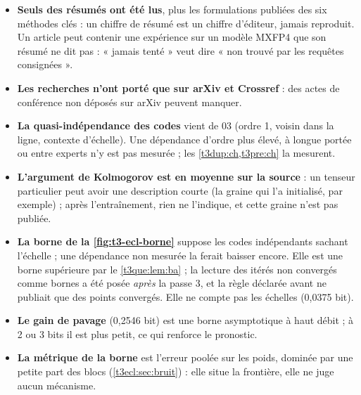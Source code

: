 \begin{faux}
\begin{itemize}
\item \textbf{Seuls des résumés ont été lus}, plus les formulations publiées des six méthodes clés : un chiffre de résumé est un chiffre d'éditeur, jamais reproduit. Un article peut contenir une expérience sur un modèle MXFP4 que son résumé ne dit pas : « jamais tenté » veut dire « non trouvé par les requêtes consignées ».
\item \textbf{Les recherches n'ont porté que sur arXiv et Crossref} : des actes de conférence non déposés sur arXiv peuvent manquer.
\item \textbf{La quasi-indépendance des codes} vient de 03 (ordre 1, voisin dans la ligne, contexte d'échelle). Une dépendance d'ordre plus élevé, à longue portée ou entre experts n'y est pas mesurée ; les \cref{t3dup:ch,t3pre:ch} la mesurent.
\item \textbf{L'argument de Kolmogorov est en moyenne sur la source} : un tenseur particulier peut avoir une description courte (la graine qui l'a initialisé, par exemple) ; après l'entraînement, rien ne l'indique, et cette graine n'est pas publiée.
\item \textbf{La borne de la \cref{fig:t3-ecl-borne}} suppose les codes indépendants sachant l'échelle ; une dépendance non mesurée la ferait baisser encore. Elle est une borne supérieure par le \cref{t3que:lem:ba} ; la lecture des itérés non convergés comme bornes a été posée \emph{après} la passe 3, et la règle déclarée avant ne publiait que des points convergés. Elle ne compte pas les échelles (0,0375 bit).
\item \textbf{Le gain de pavage} (0,2546 bit) est une borne asymptotique à haut débit ; à 2 ou 3 bits il est plus petit, ce qui renforce le pronostic.
\item \textbf{La métrique de la borne} est l'erreur poolée sur les poids, dominée par une petite part des blocs (\cref{t3ecl:sec:bruit}) : elle situe la frontière, elle ne juge aucun mécanisme.
\end{itemize}
\end{faux}
